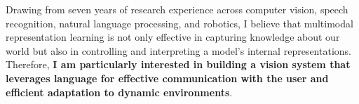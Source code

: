\documentclass[10pt, letterpaper]{awesome-cv} %
\begin{document}
\makecvheader %

\begin{cvletter}
\vspace*{-0.05cm}
Drawing from seven years of research experience across computer vision, speech recognition, natural language processing, and robotics, I believe that multimodal representation learning is not only effective in capturing knowledge about our world but also in controlling and interpreting a model’s internal representations. Therefore, \textbf{I am particularly interested in building a vision system that leverages language for effective communication with the user and efficient adaptation to dynamic environments}.
\end{cvletter}








%
%
%

\end{document}
